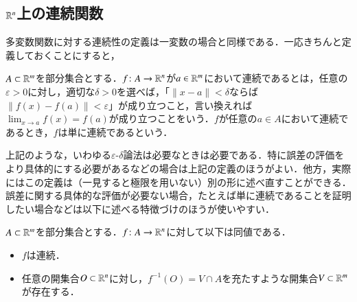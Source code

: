 \subsection{$\mathbb{R}^n$上の連続関数}

多変数関数に対する連続性の定義は一変数の場合と同様である．一応きちんと定義しておくことにすると，

\begin{defi}
$A \subset \mathbb{R}^m$を部分集合とする．$f \colon A \to \mathbb{R}^n$が$a \in \mathbb{R}^m$において連続であるとは，任意の$\varepsilon > 0$に対し，適切な$\delta > 0$を選べば，「$\|x - a\| < \delta$ならば$\| f(x) - f(a) \| < \varepsilon$」が成り立つこと，言い換えれば$\lim_{x \to a}f(x) = f(a)$が成り立つことをいう．$f$が任意の$a \in A$において連続であるとき，$f$は単に連続であるという．
\end{defi}

上記のような，いわゆる$\varepsilon$-$\delta$論法は必要なときは必要である．特に誤差の評価をより具体的にする必要があるなどの場合は上記の定義のほうがよい．他方，実際にはこの定義は（一見すると極限を用いない）別の形に述べ直すことができる．誤差に関する具体的な評価が必要ない場合，たとえば単に連続であることを証明したい場合などは以下に述べる特徴づけのほうが使いやすい．

\begin{thm}
$A \subset \mathbb{R}^m$を部分集合とする．$f \colon A \to \mathbb{R}^n$に対して以下は同値である．
\begin{itemize}
\item $f$は連続．
\item 任意の開集合$O \subset \mathbb{R}^n$に対し，$f^{-1}(O) = V \cap A$を充たすような開集合$V \subset \mathbb{R}^m$が存在する．
\end{itemize}
\end{thm}


